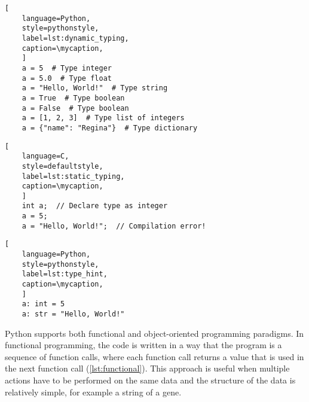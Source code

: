 \def\mycaption{ Example of dynamic typing in python. The variable ``\texttt{a}''
    is assigned the value 5, which is an integer. The variable ``\texttt{a}'' is
    then assigned the value ``\texttt{Hello, World!}'', which is a string.
    Python allows  Note that code after ``\texttt{\#}'' is considered a comment
    and won't be executed.}
\begin{lstlisting}[
    language=Python,
    style=pythonstyle,
    label=lst:dynamic_typing,
    caption=\mycaption,
    ]
    a = 5  # Type integer
    a = 5.0  # Type float
    a = "Hello, World!"  # Type string
    a = True  # Type boolean
    a = False  # Type boolean
    a = [1, 2, 3]  # Type list of integers
    a = {"name": "Regina"}  # Type dictionary
\end{lstlisting}
\def\mycaption{ Example of static typing in C. The variable ``a'' is declared as
    an integer, and can only store integers. The variable ``a'' is then assigned
    the value 5, which is an integer. The variable ``a'' is then assigned the
    value ``Hello, World!'', which is a string. This results in a compilation
    error, because the variable ``a'' can only store integers.}
\begin{lstlisting}[
    language=C,
    style=defaultstyle,
    label=lst:static_typing,
    caption=\mycaption,
    ]
    int a;  // Declare type as integer
    a = 5;
    a = "Hello, World!";  // Compilation error!
\end{lstlisting}
\def\mycaption{ Example of type hints used in python. Explicitly stating
    the type of the variable is optional and does not change the
    behavior of the code as shown in \autoref{lst:dynamic_typing}.}
\begin{lstlisting}[
    language=Python,
    style=pythonstyle,
    label=lst:type_hint,
    caption=\mycaption,
    ]
    a: int = 5
    a: str = "Hello, World!"
\end{lstlisting}


Python supports both functional and object-oriented programming paradigms. In
functional programming, the code is written in a way that the program is a
sequence of function calls, where each function call returns a value that is
used in the next function call (\autoref{lst:functional}). This approach is
useful when multiple actions have to be performed on the same data and the
structure of the data is relatively simple, for example a string of a gene.

